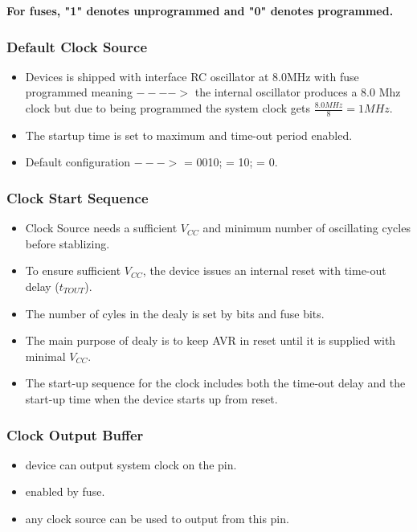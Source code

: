 \documentclass{article}
\begin{document}
{\Large \textbf{For fuses, "1" denotes unprogrammed and "0" denotes programmed.}}

\subsubsection*{Default Clock Source}
\begin{itemize}
    \item Devices is shipped with interface RC oscillator at 8.0MHz with fuse  programmed meaning $---->$ the internal oscillator produces a 8.0 Mhz clock but due to  being programmed the system clock gets $\frac{8.0 MHz}{8} = 1 MHz$.
    \item The startup time is set to maximum and time-out period enabled.
    \item Default configuration $--->$  = 0010;  = 10;  = 0.
\end{itemize}

\subsubsection*{Clock Start Sequence}
\begin{itemize}
    \item Clock Source needs a sufficient $V_{CC}$ and minimum number of oscillating cycles before stablizing.
    \item To ensure sufficient $V_{CC}$, the device issues an internal reset with time-out delay ($t_{TOUT}$).
    \item The number of cyles in the dealy is set by  bits and  fuse bits.
    \item The main purpose of dealy is to keep AVR in reset until it is supplied with minimal $V_{CC}$.
    \item The start-up sequence for the clock includes both the time-out delay and the start-up time when the device starts up from
          reset.
\end{itemize}

\subsubsection*{Clock Output Buffer}
\begin{itemize}
    \item device can output system clock on the  pin.
    \item enabled by  fuse.
    \item any clock source can be used to output from this pin.
\end{itemize}
\end{document}
